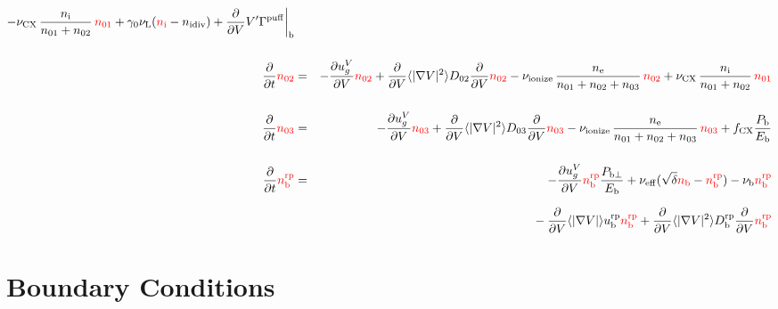 \documentclass[11pt]{article}
\def\r#1{{\rm#1}}
\def\aves#1{\langle#1\rangle}
\def\dd#1#2{\frac{\partial #1}{\partial #2}}
\def\ddV{\frac{\partial}{\partial V}}
\def\ddt{\frac{\partial}{\partial t}}
\def\nee{n_\r{e}}
\def\ni{n_\r{i}}
\def\nb{n_\r{b}}
\def\ugV{u_{g}^V}
\def\ndiv#1{n_\r{#1div}}
\def\nbrp{n_\r{b}^\r{rp}}
\def\ubrp{u_\r{b}^\r{rp}}
\def\Dbrp{D_\r{b}^\r{rp}}
\def\Pbperp{P_{\r{b}\perp}}
\def\Pb{P_\r{b}}
\def\Eb{E_\r{b}}
\def\nna{n_{01}}
\def\nnb{n_{02}}
\def\nnc{n_{03}}
\def\nueff{\nu_\r{eff}}
\def\fCX{f_\r{CX}}
\def\nuL{\nu_\r{L}}
\def\nuCX{\nu_\r{CX}}
\def\nuion{\nu_\r{ionize}}
\def\nub{\nu_\r{b}}
\def\red#1{\textcolor{red}{#1}}
\begin{document}
\begin{eqnarray}
  - \nuCX\, \frac{\ni}{\nna + \nnb}\, \red{\nna}
%
  + \gamma_0 \nuL (\red{\ni} - \ndiv{i})
%
  + \ddV V' \Gamma^\r{puff}\biggr|_\r{b}
\\[5mm]
  \ddt \red{\nnb} &=& 
%
  - \dd{\ugV}{V} \red{\nnb}
%
  + \ddV \aves{|\nabla V|^2} D_{02} \ddV \red{\nnb}
%
  - \nuion\, \frac{\nee}{\nna + \nnb + \nnc}\, \red{\nnb}
%
  + \nuCX\, \frac{\ni}{\nna + \nnb}\, \red{\nna}
%
\\[5mm]
  \ddt \red{\nnc} &=& 
%
  - \dd{\ugV}{V} \red{\nnc}
%
  + \ddV \aves{|\nabla V|^2} D_{03} \ddV \red{\nnc}
%
  - \nuion\, \frac{\nee}{\nna + \nnb + \nnc}\, \red{\nnc}
%
  + \fCX \frac{\Pb}{\Eb}
\\[5mm]
  \ddt \red{\nbrp} &=&
%
  - \dd{\ugV}{V} \red{\nbrp}
%
    \frac{\Pbperp}{\Eb}
%
  + \nueff (\sqrt{\delta} \red{\nb} - \red{\nbrp})
%
  - \nub \red{\nbrp}
%
\nonumber\\[2.5mm]&&{}
  - \ddV \aves{|\nabla V|} \ubrp \red{\nbrp} 
  + \ddV \aves{|\nabla V|^2} \Dbrp \ddV \red{\nbrp}
\end{eqnarray}

\bigskip

\section{Boundary Conditions}
\end{document}

